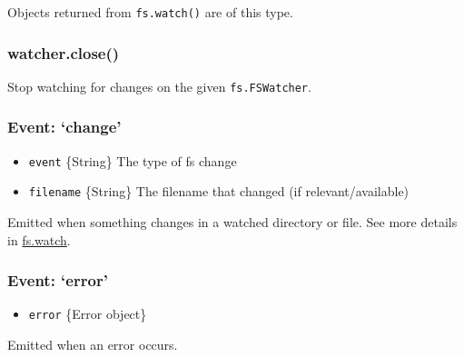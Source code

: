 Objects returned from \texttt{fs.watch()} are of this type.

\subsubsection{watcher.close()}\label{watcher.close}

Stop watching for changes on the given \texttt{fs.FSWatcher}.

\subsubsection{Event: `change'}\label{event-change}

\begin{itemize}
\itemsep1pt\parskip0pt
\item
  \texttt{event} \{String\} The type of fs change
\item
  \texttt{filename} \{String\} The filename that changed (if
  relevant/available)
\end{itemize}

Emitted when something changes in a watched directory or file. See more
details in
\hyperref[fsux5ffsux5fwatchux5ffilenameux5foptionsux5flistener]{fs.watch}.

\subsubsection{Event: `error'}\label{event-error}

\begin{itemize}
\itemsep1pt\parskip0pt
\item
  \texttt{error} \{Error object\}
\end{itemize}

Emitted when an error occurs.
